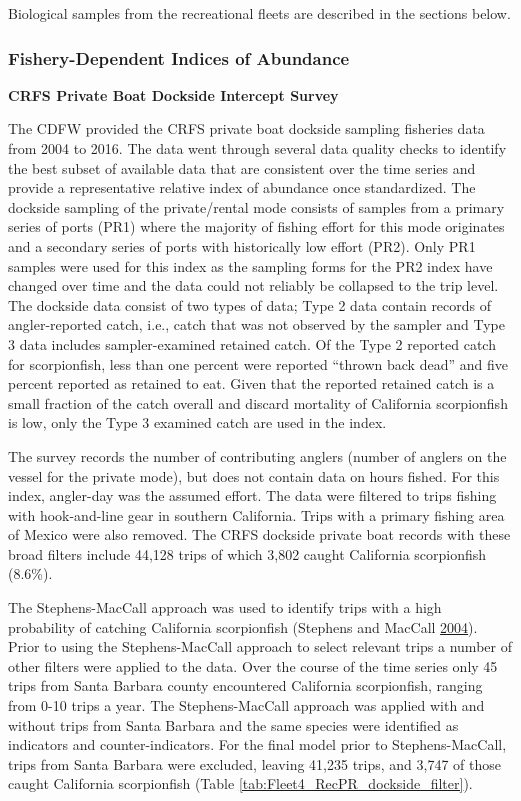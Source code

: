 \documentclass[12pt,]{article}
\begin{document}
Biological samples from the recreational fleets are described in the
sections below.

\subsubsection{Fishery-Dependent Indices of
Abundance}\label{fishery-dependent-indices-of-abundance}

\textbf{CRFS Private Boat Dockside Intercept Survey}

The CDFW provided the CRFS private boat dockside sampling fisheries data
from 2004 to 2016. The data went through several data quality checks to
identify the best subset of available data that are consistent over the
time series and provide a representative relative index of abundance
once standardized. The dockside sampling of the private/rental mode
consists of samples from a primary series of ports (PR1) where the
majority of fishing effort for this mode originates and a secondary
series of ports with historically low effort (PR2). Only PR1 samples
were used for this index as the sampling forms for the PR2 index have
changed over time and the data could not reliably be collapsed to the
trip level. The dockside data consist of two types of data; Type 2 data
contain records of angler-reported catch, i.e., catch that was not
observed by the sampler and Type 3 data includes sampler-examined
retained catch. Of the Type 2 reported catch for scorpionfish, less than
one percent were reported ``thrown back dead'' and five percent reported
as retained to eat. Given that the reported retained catch is a small
fraction of the catch overall and discard mortality of California
scorpionfish is low, only the Type 3 examined catch are used in the
index.

The survey records the number of contributing anglers (number of anglers
on the vessel for the private mode), but does not contain data on hours
fished. For this index, angler-day was the assumed effort. The data were
filtered to trips fishing with hook-and-line gear in southern
California. Trips with a primary fishing area of Mexico were also
removed. The CRFS dockside private boat records with these broad filters
include 44,128 trips of which 3,802 caught California scorpionfish
(8.6\%).

The Stephens-MacCall approach was used to identify trips with a high
probability of catching California scorpionfish (Stephens and MacCall
\protect\hyperlink{ref-Stephens2004}{2004}). Prior to using the
Stephens-MacCall approach to select relevant trips a number of other
filters were applied to the data. Over the course of the time series
only 45 trips from Santa Barbara county encountered California
scorpionfish, ranging from 0-10 trips a year. The Stephens-MacCall
approach was applied with and without trips from Santa Barbara and the
same species were identified as indicators and counter-indicators. For
the final model prior to Stephens-MacCall, trips from Santa Barbara were
excluded, leaving 41,235 trips, and 3,747 of those caught California
scorpionfish (Table \ref{tab:Fleet4_RecPR_dockside_filter}).
\end{document}
